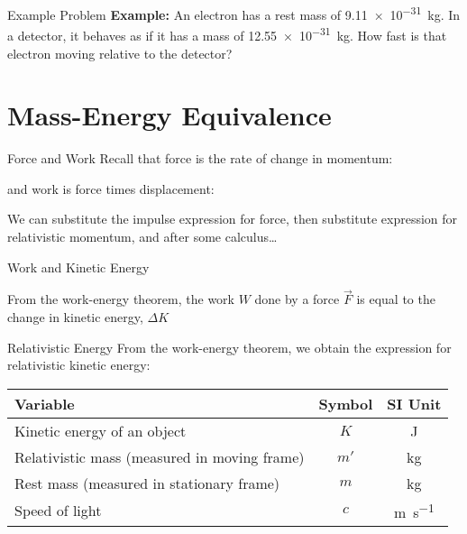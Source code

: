 \documentclass[12pt,compress,aspectratio=169]{beamer}
\newcommand{\bigsqrt}{\ensuremath\sqrt{1-\left(\dfrac vc\right)^2}}
\begin{document}
\begin{frame}{Example Problem}
  \textbf{Example:} An electron has a rest mass of \SI{9.11e-31}{\kilo\gram}.
  In a detector, it behaves as if it has a mass of \SI{12.55e-31}{\kilo\gram}.
  How fast is that electron moving relative to the detector?
\end{frame}



\section{Mass-Energy Equivalence}

\begin{frame}{Force and Work}
  Recall that force is the rate of change in momentum:


  and work is force times displacement:


  We can substitute the impulse expression for force, then substitute expression
  for relativistic momentum, and after some calculus\ldots
\end{frame}



\begin{frame}{Work and Kinetic Energy}

  \eq{-.2in}{
    W=\frac{mc^2}{\bigsqrt}-mc^2 = \Delta K
  }

  From the work-energy theorem, the work $W$ done by a force $\vec F$ is equal
  to the change in kinetic energy, $\Delta K$
\end{frame}



\begin{frame}{Relativistic Energy}
  From the work-energy theorem, we obtain the expression for relativistic
  kinetic energy:
  
  \begin{center}
    \begin{tabular}{l|c|c}
      \rowcolor{pink}
      \textbf{Variable} & \textbf{Symbol} & \textbf{SI Unit}\\ \hline
      Kinetic energy of an object & $K$  & \si\joule \\
      Relativistic mass (measured in moving frame) & $m'$ & \si{\kilo\gram}\\
      Rest mass (measured in stationary frame) & $m$ & \si{\kilo\gram}\\
      Speed of light                           & $c$ & \si{\metre\per\second}
    \end{tabular}
  \end{center}
\end{frame}
\end{document}
